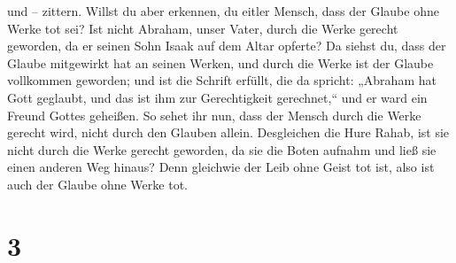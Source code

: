 und -- zittern.  Willst du aber erkennen, du eitler
Mensch, dass der Glaube ohne Werke tot sei?  Ist nicht
Abraham, unser Vater, durch die Werke gerecht geworden, da er seinen
Sohn Isaak auf dem Altar opferte?  Da siehst du, dass der
Glaube mitgewirkt hat an seinen Werken, und durch die Werke ist der
Glaube vollkommen geworden;  und ist die Schrift erfüllt,
die da spricht: „Abraham hat Gott geglaubt, und das ist ihm zur
Gerechtigkeit gerechnet,`` und er ward ein Freund Gottes geheißen.
 So sehet ihr nun, dass der Mensch durch die Werke
gerecht wird, nicht durch den Glauben allein. 
Desgleichen die Hure Rahab, ist sie nicht durch die Werke gerecht
geworden, da sie die Boten aufnahm und ließ sie einen anderen Weg
hinaus?  Denn gleichwie der Leib ohne Geist tot ist, also
ist auch der Glaube ohne Werke tot.

\hypertarget{section-2}{%
\section{3}\label{section-2}}

